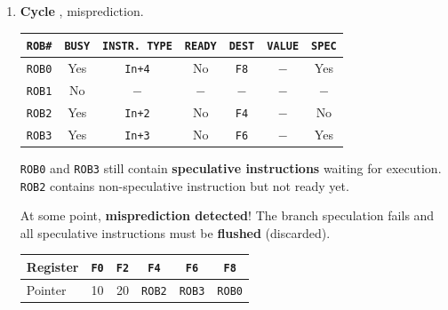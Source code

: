 \begin{examplebox}
\begin{enumerate}
        \item \textbf{Cycle \theenumi}, misprediction.
        \begin{center}
            \begin{tabular}{@{} c | c | c | c | c | c | c @{}}
                \toprule
                \texttt{ROB\#} & \texttt{BUSY} & \texttt{INSTR. TYPE} & \texttt{READY} & \texttt{DEST} & \texttt{VALUE} & \texttt{SPEC} \\
                \midrule
                \texttt{ROB0} & Yes         & \texttt{In+4}         & No        & \texttt{F8}       & $-$       & Yes           \\ [.3em]
                \texttt{ROB1} & No          & $-$                   & $-$       & $-$               & $-$       & $-$           \\ [.3em]
                \texttt{ROB2} & Yes         & \texttt{In+2}         & No        & \texttt{F4}       & $-$       & No            \\ [.3em]
                \texttt{ROB3} & Yes         & \texttt{In+3}         & No        & \texttt{F6}       & $-$       & Yes           \\
                \bottomrule
            \end{tabular}
        \end{center}
        \texttt{ROB0} and \texttt{ROB3} still contain \textbf{speculative instructions} waiting for execution. \texttt{ROB2} contains non-speculative instruction but not ready yet.

        At some point, \textbf{misprediction detected}! The branch speculation fails and all speculative instructions must be \textbf{flushed} (discarded).
        \begin{center}
            \begin{tabular}{@{} l | c c c c c @{}}
                \toprule
                Register    & \texttt{F0}   & \texttt{F2}   & \texttt{F4}           & \texttt{F6}           & \texttt{F8}           \\
                \midrule
                Pointer     & 10            & 20            & \texttt{ROB2}         & \texttt{ROB3}         & \texttt{ROB0}         \\
                \bottomrule
            \end{tabular}
        \end{center}


        \newpage



\end{enumerate}
\end{examplebox}
